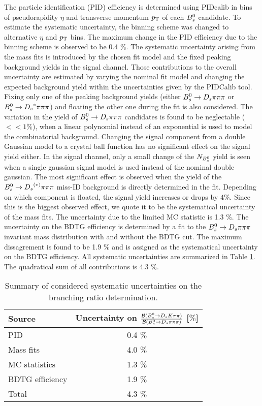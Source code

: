 The particle identification (PID) efficiency is determined using PIDcalib in bins of pseudorapidity $\eta$ and transverse momentum $\mbox{$p_{\mathrm{ T}}$}$ of each ${{B}^0_{s}}$ candidate. 
To estimate the systematic uncertainty, the binning scheme was changed to alternative $\eta$ and $\mbox{$p_{\mathrm{ T}}$}$ bins. The maximum change in the PID efficiency due to the binning scheme is observed to be 0.4 $\%$. \newline
The systematic uncertainty arising from the mass fits is introduced by the chosen fit model and the fixed peaking background yields in the signal channel. 
Those contributions to the overall uncertainty are estimated by varying the nominal fit model and changing the expected background yield within the uncertainties given by the PIDCalib tool. 
Fixing only one of the peaking background yields (either ${{B}^0_{s}}\rightarrow{\ensuremath{{D}_{s}}}{\ensuremath{\pi}}{\ensuremath{\pi}}{\ensuremath{\pi}}$ or ${{B}^0_{s}}\rightarrow{\ensuremath{{D}_{s}}}^{*}{\pi}{\pi}{\pi}$) and floating the other one during the fit is also considered.
The variation in the yield of ${{B}^0_{s}}\rightarrow{\ensuremath{{D}_{s}}}{\ensuremath{\pi}}{\ensuremath{\pi}}{\ensuremath{\pi}}$ candidates is found to be neglectable ($<< 1 \%$), when a linear polynomial instead of an exponential is used to model the combinatorial background. 
Changing the signal component from a double Gaussian model to a crystal ball function has no significant effect on the signal yield either. 
In the signal channel, only a small change of the $N_{{{B}^0_{s}}}$ yield is seen when a single gaussian signal model is used instead of the nominal double gaussian. 
The most significant effect is observed when the yield of the ${{B}^0_{s}}\rightarrow{\ensuremath{{D}_{s}}}^{(*)}{\pi}{\pi}{\pi}$ miss-ID background is directly determined in the fit. 
Depending on which component is floated, the signal yield increases or drops by $4 \%$. Since this is the biggest observed effect, we quote it to be the systematical uncertainty of the mass fits.     
The uncertainty due to the limited MC statistic is 1.3 $\%$. \newline
The uncertainty on the BDTG efficiency is determined by a fit to the ${{B}^0_{s}}\rightarrow{\ensuremath{{D}_{s}}}{\ensuremath{\pi}}{\ensuremath{\pi}}{\ensuremath{\pi}}$ invariant mass distribution with and without the BDTG cut. 
The maximum dissagrement is found to be 1.9 $\%$ and is assigned as the systematical uncertainty on the BDTG efficiency. \newline
All systematic uncertainties are summarized in Table \ref{tab: systTab}. The quadratical sum of all contributions is 4.3 $\%$.  

\begin{table}[h!]
\centering
\begin{tabular}{l c}
Source  & Uncertainty on $\frac{\mathcal{B}({{B}^0_{s}}\rightarrow{\ensuremath{{D}_{s}}}{\ensuremath{K}}{\ensuremath{\pi}}{\ensuremath{\pi}})}{\mathcal{B}({{B}^0_{s}}\rightarrow{\ensuremath{{D}_{s}}}{\ensuremath{\pi}}{\ensuremath{\pi}}{\ensuremath{\pi}})}$ [$\%$]\\
\hline
PID & 0.4 $\%$ \\
Mass fits & 4.0 $\%$\\
MC statistics & 1.3 $\%$ \\
BDTG efficiency & 1.9 $\%$ \\
\hline
Total & 4.3 $\%$\\
\hline
\end{tabular}
\caption{Summary of considered systematic uncertainties on the branching ratio determination.}
\label{tab: systTab}
\end{table}
